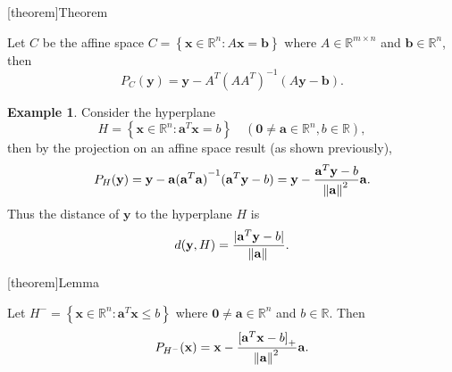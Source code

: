 \documentclass[12pt]{report}
\theoremstyle{definition}
\begin{document}
[theorem]{Theorem}
\begin{orthogonal projectinos onto affine space}
    Let $C$ be the affine space
    $C=\left\{\mathbf{x}\in\mathbb{R}^{n}:A\mathbf{x}=\mathbf{b}\right\}$
    where $A\in\mathbb{R}^{m\times n}$ and $\mathbf{b}\in\mathbb{R}^{n}$, then
    \[
        P_C(\mathbf{y})=\mathbf{y}-A^T{(AA^T)}^{-1}(A\mathbf{y}-\mathbf{b}).
    \]
\end{orthogonal projectinos onto affine space}
\newtheorem{hyperplane orthogonal projection}[theorem]{Example}
\begin{hyperplane orthogonal projection}
    Consider the hyperplane
    \[
        H=\left\{\mathbf{x}\in\mathbb{R}^{n}:\mathbf{a}^T\mathbf{x}=b\right\}
        \quad
        \left(\mathbf{0}\neq\mathbf{a}\in\mathbb{R}^{n},b\in\mathbb{R}\right),
    \]
    then by the projection on an affine space result (as shown previously),
    \[
        P_H(\mathbf{y})=\mathbf{y}-\mathbf{a}{(\mathbf{a}^T\mathbf{a})}^{-1}(\mathbf{a}^T\mathbf{y}-b)
        =\mathbf{y}-\frac{\mathbf{a}^T\mathbf{y}-b}{\norm{\mathbf{a}}^2}\mathbf{a}.
    \]
    Thus the distance of $\mathbf{y}$ to the hyperplane $H$ is
    \[
        d(\mathbf{y},H)=\frac{|\mathbf{a}^T\mathbf{y}-b|}{\norm{\mathbf{a}}}.
    \]
\end{hyperplane orthogonal projection}

[theorem]{Lemma}
\begin{distance of a point from a half space}
    Let $H^-=\left\{\mathbf{x}\in\mathbb{R}^n:\mathbf{a}^T\mathbf{x}\le
    b\right\}$ where $\mathbf{0}\neq\mathbf{a}\in\mathbb{R}^{n}$ and
    $b\in\mathbb{R}$. Then
    \[
        P_{H^-}(\mathbf{x})=\mathbf{x}-\frac{{[\mathbf{a}^T\mathbf{x}-b]}_{+}}{\norm{\mathbf{a}}^2}\mathbf{a}.
    \]
\end{distance of a point from a half space}
\end{document}
